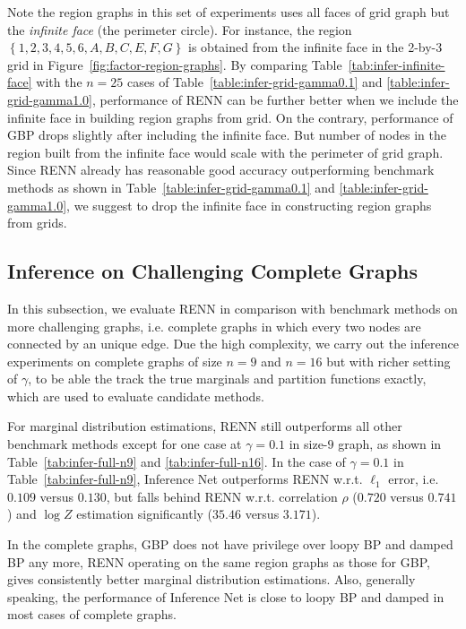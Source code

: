 \sloppy Note the region graphs in this set of experiments uses all faces of grid graph but the \textit{infinite face} (the perimeter circle). For instance, the region $\left\{1, 2, 3, 4, 5, 6, A, B, C ,E, F, G\right\}$ is obtained from the infinite face in the 2-by-3 grid in Figure~\ref{fig:factor-region-graphs}. By comparing Table~\ref{tab:infer-infinite-face} with the $n=25$ cases of Table~\ref{table:infer-grid-gamma0.1} and \ref{table:infer-grid-gamma1.0}, performance of RENN can be further better when we include the infinite face in building region graphs from grid. On the contrary, performance of GBP drops slightly after including the infinite face. But number of nodes in the region built from the infinite face would scale with the perimeter of grid graph. Since RENN already has reasonable good accuracy outperforming benchmark methods as shown in Table~\ref{table:infer-grid-gamma0.1} and \ref{table:infer-grid-gamma1.0}, we suggest to drop the infinite face in constructing region graphs from grids.


\subsection{Inference on Challenging Complete Graphs}

In this subsection, we evaluate RENN in comparison with benchmark methods on more challenging graphs, i.e. complete graphs in which every two nodes are connected by an unique edge. Due the high complexity, we carry out the inference experiments on complete graphs of size $n=9$ and $n=16$ but with richer setting of $\gamma$, to be able the track the true marginals and partition functions exactly, which are used to evaluate candidate methods.

For marginal distribution estimations, RENN still outperforms all other benchmark methods except for one case at $\gamma=0.1$ in size-$9$ graph, as shown in Table~\ref{tab:infer-full-n9} and \ref{tab:infer-full-n16}. In the case of $\gamma=0.1$ in Table~\ref{tab:infer-full-n9}, Inference Net outperforms RENN w.r.t. $\ell_1$ error, i.e. $0.109$ versus $0.130$, but falls behind RENN w.r.t. correlation $\rho$ ($0.720$ versus $0.741$) and $\log{Z}$ estimation significantly ($35.46$ versus $3.171$).

In the complete graphs, GBP does not have privilege over loopy BP and damped BP any more, RENN operating on the same region graphs as those for GBP, gives consistently better marginal distribution estimations. Also, generally speaking, the performance of Inference Net is close to loopy BP and damped in most cases of complete graphs.

